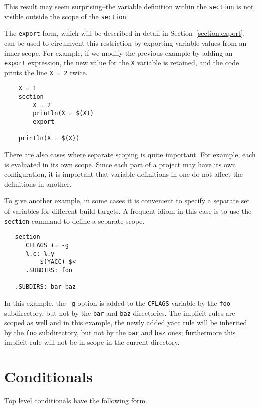 This result may seem surprising--the variable definition within the
\verb+section+ is not visible outside the scope of the \verb+section+.

The \verb+export+ form, which will be described in detail in
Section~\ref{section:export}, can be used to circumvent this restriction by
exporting variable values from an inner scope.
For example, if we modify the previous example
by adding an \verb+export+ expression, the new value for the \verb+X+
variable is retained, and the code prints the line \verb+X = 2+ twice.

\begin{verbatim}
    X = 1
    section
        X = 2
        println(X = $(X))
        export

    println(X = $(X))
\end{verbatim}

There are also cases where separate scoping is quite important.  For example,
each  is evaluated in its own scope.  Since each part of a project
may have its own configuration, it is important that variable definitions in one
 do not affect the definitions in another.

To give another example, in some cases it is convenient to specify a
separate set of variables for different build targets.  A frequent
idiom in this case is to use the \verb+section+ command to define a
separate scope.

\begin{verbatim}
   section
      CFLAGS += -g
      %.c: %.y
          $(YACC) $<
      .SUBDIRS: foo

   .SUBDIRS: bar baz
\end{verbatim}

In this example, the \verb+-g+ option is added to the \verb+CFLAGS+
variable by the \verb+foo+ subdirectory, but not by the \verb+bar+ and
\verb+baz+ directories. The implicit rules are scoped as well and in this
example, the newly added yacc rule will be inherited by the \verb+foo+
subdirectory, but not by the \verb+bar+ and \verb+baz+ ones; furthermore
this implicit rule will not be in scope in the current directory.

\section{Conditionals}
\label{section:conditionals}

Top level conditionals have the following form.

